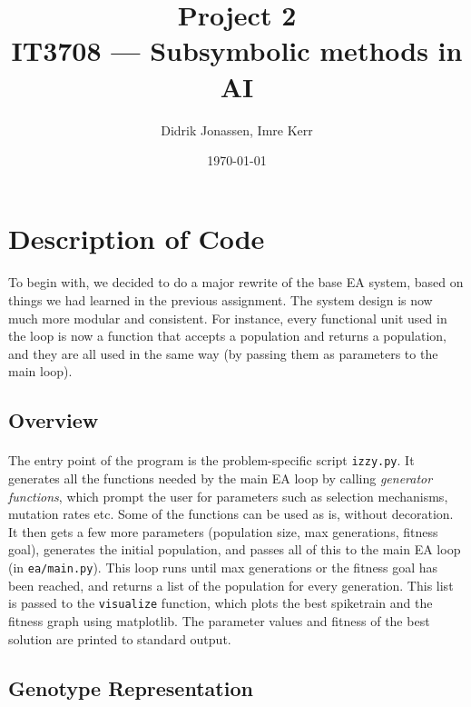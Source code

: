 \documentclass[a4paper,12pt]{article}
\author{Didrik Jonassen, Imre Kerr\vspace{-2ex}}
\title{\vspace{-12ex}Project 2\\ IT3708 --- Subsymbolic methods in AI}
\date{\today}
\begin{document}
\maketitle

\section{Description of Code}

\paragraph{}To begin with, we decided to do a major rewrite of the base EA system, based on things we had learned in the previous assignment. The system design is now much more modular and consistent. For instance, every functional unit used in the loop is now a function that accepts a population and returns a population, and they are all used in the same way (by passing them as parameters to the main loop).

\subsection{Overview}
\paragraph{}The entry point of the program is the problem-specific script \texttt{izzy.py}. It generates all the functions needed by the main EA loop by calling \textit{generator functions}, which prompt the user for parameters such as selection mechanisms, mutation rates etc. Some of the functions can be used as is, without decoration. It then gets a few more parameters (population size, max generations, fitness goal), generates the initial population, and passes all of this to the main EA loop (in \texttt{ea/main.py}). This loop runs until max generations or the fitness goal has been reached, and returns a list of the population for every generation. This list is passed to the \texttt{visualize} function, which plots the best spiketrain and the fitness graph using matplotlib. The parameter values and fitness of the best solution are printed to standard output.

\subsection{Genotype Representation}
\end{document}

